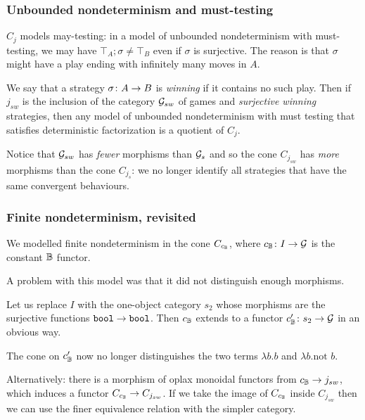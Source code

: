 \documentclass{beamer}
\begin{document}
\begin{frame}
  \frametitle{Unbounded nondeterminism and must-testing}

  $C_j$ models may-testing: in a model of unbounded nondeterminism with must-testing, we may have $\top_A;\sigma\ne \top_B$ even if $\sigma$ is surjective.  
  The reason is that $\sigma$ might have a play ending with infinitely many moves in $A$.
  \pause

  We say that a strategy $\sigma\colon A \to B$ is \emph{winning} if it contains no such play.  
  Then if $j_{sw}$ is the inclusion of the category $\mathcal G_{sw}$ of games and \emph{surjective winning} strategies, then any model of unbounded nondeterminism with must testing that satisfies deterministic factorization is a quotient of $C_j$.
  \pause

  Notice that $\mathcal G_{sw}$ has \emph{fewer} morphisms than $\mathcal G_s$ and so the cone $C_{j_{sw}}$ has \emph{more} morphisms than the cone $C_{j_s}$: we no longer identify all strategies that have the same convergent behaviours.
\end{frame}

\begin{frame}
  \frametitle{Finite nondeterminism, revisited}

  We modelled finite nondeterminism in the cone $C_{c_{\mathbb{B}}}$, where $c_{\mathbb{B}}\colon I \to \mathcal G$ is the constant $\mathbb{B}$ functor.
  \pause

  A problem with this model was that it did not distinguish enough morphisms.
  \pause

  Let us replace $I$ with the one-object category $s_2$ whose morphisms are the surjective functions ${\mathtt{bool}}\to{\mathtt{bool}}$.
  Then $c_{\mathbb{B}}$ extends to a functor $c_{\mathbb{B}}'\colon s_2\to \mathcal G$ in an obvious way.
  \pause

  The cone on $c_{\mathbb{B}}'$ now no longer distinguishes the two terms $\lambda b.b$ and $\lambda b.\text{not }b$.
  \pause

  Alternatively: there is a morphism of oplax monoidal functors from $c_{\mathbb{B}}\to j_{sw}$, which induces a functor $C_{c_{\mathbb{B}}}\to C_{j_{sw}}$.  
  If we take the image of $C_{c_{\mathbb{B}}}$ inside $C_{j_{sw}}$ then we can use the finer equivalence relation with the simpler category.
\end{frame}
\end{document}
